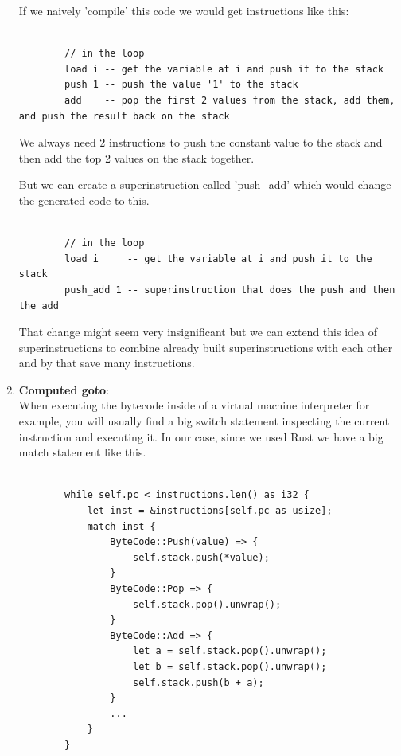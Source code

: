 \documentclass{article}
\begin{document}
\begin{enumerate}
        If we naively 'compile' this code we would get instructions like this:

        \begin{verbatim}

        // in the loop
        load i -- get the variable at i and push it to the stack
        push 1 -- push the value '1' to the stack
        add    -- pop the first 2 values from the stack, add them, and push the result back on the stack

        \end{verbatim}

        We always need 2 instructions to push the constant value to the stack and then add the top
        2 values on the stack together.

        But we can create a superinstruction called 'push\_add' which would change the generated
        code to this.

        \begin{verbatim}

        // in the loop
        load i     -- get the variable at i and push it to the stack
        push_add 1 -- superinstruction that does the push and then the add

        \end{verbatim}

        That change might seem very insignificant but we can extend this idea
        of superinstructions to combine already built superinstructions with
        each other and by that save many instructions.


    \item \textbf{Computed goto}:\\
    \label{it:goto}
        When executing the bytecode inside of a virtual machine interpreter for
        example, you will usually find a big switch statement inspecting the
        current instruction and executing it. In our case, since we used Rust
        we have a big match statement like this.

        \begin{verbatim}

        while self.pc < instructions.len() as i32 {
            let inst = &instructions[self.pc as usize];
            match inst {
                ByteCode::Push(value) => {
                    self.stack.push(*value);
                }
                ByteCode::Pop => {
                    self.stack.pop().unwrap();
                }
                ByteCode::Add => {
                    let a = self.stack.pop().unwrap();
                    let b = self.stack.pop().unwrap();
                    self.stack.push(b + a);
                }
                ...
            }
        }
        \end{verbatim}


\end{enumerate}
\end{document}
